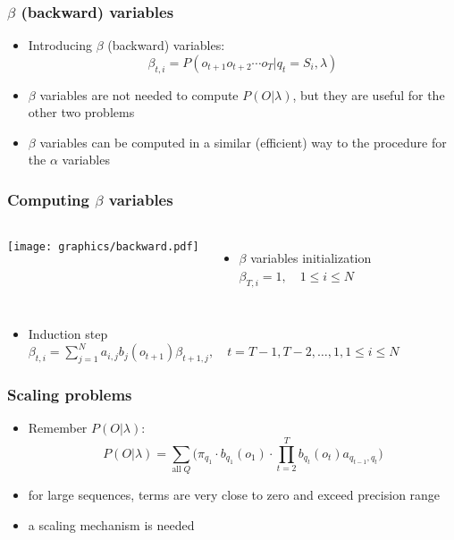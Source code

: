 \documentclass{beamer}
\begin{document}
\begin{frame}
  \frametitle{$\beta$ (backward) variables}
  \begin{itemize}
  \item Introducing $\beta$ (backward) variables:
    \begin{equation}
      \label{eq:beta}
      \beta_{t,i}=P(o_{t+1} o_{t+2} \cdots o_{T} \vert q_t = S_i, \lambda)
    \end{equation}
    \vspace*{1em} \pause
  \item $\beta$ variables are not needed to compute $P(O \vert
    \lambda)$, but they are useful for the other two problems
  \item $\beta$ variables can be computed in a similar (efficient) way
    to the procedure for the $\alpha$ variables
  \end{itemize}
\end{frame}

\begin{frame}
  \frametitle{Computing $\beta$ variables}
  \begin{columns}[B]
    \texttt{[image: graphics/backward.pdf]}
    \begin{itemize}
    \item $\beta$ variables initialization \\
      $\beta_{T,i}=1,\quad 1 \le i \le N$
    \end{itemize}
  \end{columns}
  \begin{itemize}
  \item Induction step \\
    $\beta_{t,i}=\displaystyle\sum_{j=1}^{N}a_{i,j}b_j(o_{t+1})\beta_{t+1,j},
    \quad t = T-1, T-2, \ldots , 1, 1 \le i \le N$
  \end{itemize}
\end{frame}

\begin{frame}
  \frametitle{Scaling problems}
  \begin{itemize}
  \item Remember $P(O \vert \lambda)$:
    \begin{equation*}
      P(O \vert \lambda) =  \displaystyle\sum_{\text{all}\;Q} \Big( \pi_{q_1} \cdot
      b_{q_1}(o_1) \cdot \displaystyle\prod_{t=2}^{T} b_{q_t}(o_t)
      a_{q_{t-1},q_t} \Big)
    \end{equation*}
    \pause
  \item for large sequences, terms are very close to zero and exceed
    precision range
  \item a scaling mechanism is needed
  \end{itemize}
\end{frame}
\end{document}
